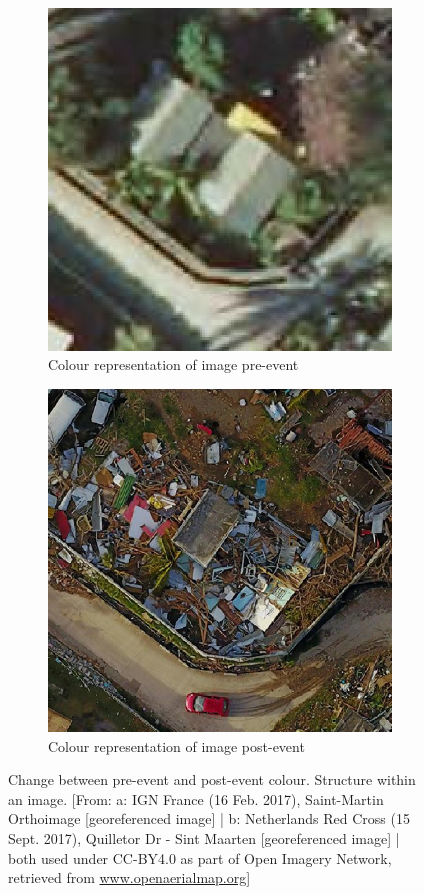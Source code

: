 \begin{figure}[!h]
	\centering
	\begin{subfigure}{.475\textwidth}
		\centering
		\includegraphics[width=.85\linewidth]{figs/CohB.png}
		\caption{\footnotesize{Colour representation of image pre-event}}
	\end{subfigure}
	\begin{subfigure}{.475\textwidth}
		\centering
		\includegraphics[width=.85\linewidth]{figs/CohA.png}
		\caption{\footnotesize{Colour representation of image post-event}}
	\end{subfigure}
	\caption{\footnotesize{Change between pre-event and post-event colour. Structure within an image. [From: a: IGN France (16 Feb. 2017), Saint-Martin Orthoimage [georeferenced image] | b: Netherlands Red Cross (15 Sept. 2017), Quilletor Dr - Sint Maarten [georeferenced image] | both used under CC-BY4.0 as part of Open Imagery Network, retrieved from \url{www.openaerialmap.org}]}}
	\label{fig:colourchange}
\end{figure}

